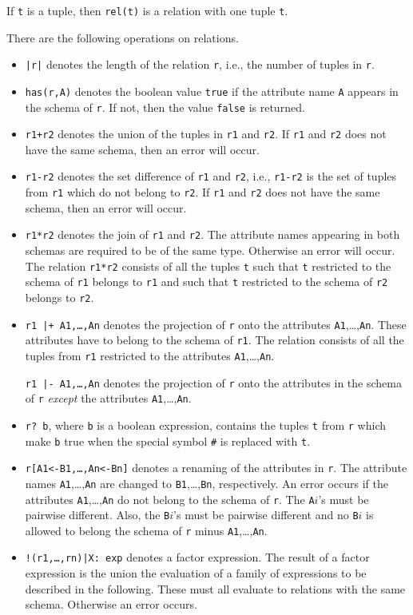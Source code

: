 \documentclass[a4,14pt,latin1]{article}
\begin{document}
If {\tt t} is a tuple, then {\tt rel(t)} is a relation with one tuple {\tt t}.

There are the following operations on relations.
\begin{itemize}
\item
{\tt |r|} denotes the length of the relation {\tt r}, i.e., the
number of tuples in {\tt r}.
\item
{\tt has(r,A)} denotes the boolean value {\tt true} if the attribute name
{\tt A} appears in the schema of {\tt r}.
If not, then the value {\tt false} is returned.
\item
{\tt r1+r2} denotes the union of the tuples in {\tt r1} and {\tt r2}.
If {\tt r1} and {\tt r2} does not have the same schema, then an error will
occur.
\item
{\tt r1-r2} denotes the set difference of {\tt r1} and {\tt r2}, i.e.,
{\tt r1-r2} is the set of tuples from {\tt r1} which do not belong to {\tt r2}.
If {\tt r1} and {\tt r2} does not have the same schema, then an error will
occur.
\item
{\tt r1*r2} denotes the join of {\tt r1} and {\tt r2}. The attribute names
appearing in both schemas are required to be of the same type. Otherwise
an error will occur. The relation {\tt r1*r2} consists of all the tuples
{\tt t} such that {\tt t} restricted to the schema of {\tt r1} belongs to
{\tt r1} and such that {\tt t} restricted to the schema of {\tt r2}
belongs to {\tt r2}.
\item
{\tt r1 |+ A1,\ldots,An} denotes the projection of {\tt r} onto
the attributes {\tt A1},\ldots,{\tt An}. These attributes have to belong
to the schema of {\tt r1}. The relation consists of all the tuples
from {\tt r1} restricted to the attributes {\tt A1},\ldots,{\tt An}.

{\tt r1 |- A1,\ldots,An} denotes the projection of {\tt r} onto the
attributes in the schema of {\tt r} {\em except\/} the attributes
{\tt A1},\ldots,{\tt An}.
\item
{\tt r?\ b}, where {\tt b} is a boolean expression, contains the tuples {\tt t}
from {\tt r} which make {\tt b} true when the special symbol {\tt \#} is
replaced with {\tt t}.
\item
{\tt r[A1<-B1,\ldots,An<-Bn]} denotes a renaming of the attributes in
{\tt r}. The attribute names {\tt A1},\ldots,{\tt An} are changed
to {\tt B1},\ldots,{\tt Bn}, respectively.
An error occurs if the attributes {\tt A1},\ldots,{\tt An} do not
belong to the schema of {\tt r}. The {\tt A}$i$'s must be pairwise different.
Also, the {\tt B}$i$'s must be pairwise different
and no {\tt B}$i$ is allowed to belong the schema of {\tt r} minus
{\tt A1},\ldots,{\tt An}.
\item
{\tt !(r1,\ldots,rn)|X:\ exp} denotes a factor expression.
The result of a factor expression is the union the evaluation
of a family of expressions to be described in the following.
These must all evaluate to relations with the same schema.
Otherwise an error occurs.


\end{itemize}
\end{document}
